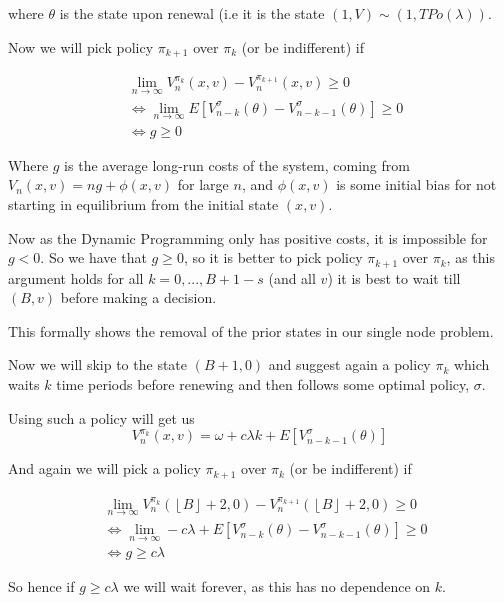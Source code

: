 \documentclass[a4paper,10pt]{article}
\newcommand{\floor}[1]{\left \lfloor #1 \right \rfloor}
\theoremstyle{definition}
\theoremstyle{definition}
\theoremstyle{remark}
\theoremstyle{definition}
\begin{document}
where $\theta$ is the state upon renewal (i.e it is the state $(1,V) \sim (1,TPo(\lambda))$.

Now we will pick policy $\pi_{k+1}$ over $\pi_{k}$ (or be indifferent) if

\begin{align*}
&\lim\limits_{n \rightarrow \infty} V_{n}^{\pi_{k}} (x,v) - V_{n}^{\pi_{k+1}}(x,v) \geq 0 \\
& \iff \lim\limits_{n \rightarrow \infty} E[V_{n-k}^{\sigma}(\theta) - V_{n-k-1}^{\sigma} (\theta)] \geq 0 \\
& \iff g \geq 0
\end{align*}

Where $g$ is the average long-run costs of the system, coming from $V_{n}(x,v)=ng + \phi(x,v)$ for large $n$, and $\phi(x,v)$ is some initial bias for not starting in equilibrium from the initial state $(x,v)$.

Now as the Dynamic Programming only has positive costs, it is impossible for $g < 0$. So we have that $g \geq 0$, so it is better to pick policy $\pi_{k+1}$ over $\pi_{k}$, as this argument holds for all $k=0,...,B+1-s$ (and all $v$) it is best to wait till $(B,v)$ before making a decision.

This formally shows the removal of the prior states in our single node problem.

Now we will skip to the state $(B+1,0)$ and suggest again a policy $\pi_{k}$ which waits $k$ time periods before renewing and then follows some optimal policy, $\sigma$.

Using such a policy will get us
\begin{equation}
V_{n}^{\pi_{k}}(x,v)= \omega +c \lambda k + E[V_{n-k-1}^{\sigma}(\theta)]
\end{equation}

And again we will pick a policy $\pi_{k+1}$ over $\pi_{k}$ (or be indifferent) if

\begin{align*}
&\lim\limits_{n \rightarrow \infty} V_{n}^{\pi_{k}} (\floor{B}+2,0) - V_{n}^{\pi_{k+1}}(\floor{B}+2,0) \geq 0 \\
& \iff \lim\limits_{n \rightarrow \infty} -c \lambda + E[V_{n-k}^{\sigma}(\theta) - V_{n-k-1}^{\sigma}(\theta)] \geq 0 \\
& \iff g \geq c \lambda
\end{align*}

So hence if $g \geq c \lambda$ we will wait forever, as this has no dependence on $k$.
\end{document}
